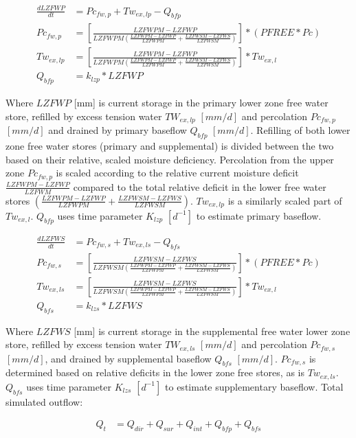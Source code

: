 \begin{align}
	\frac{dLZFWP}{dt} &= Pc_{fw,p} + Tw_{ex,lp} - Q_{bfp} \\
	Pc_{fw,p} &= \left[\frac{LZFWPM-LZFWP}{LZFWPM\left(\frac{LZFWPM-LZFWP}{LZFWPM}+\frac{LZFWSM-LZFWS}{LZFWSM}\right)}\right]*\left(PFREE*Pc\right)\\
	Tw_{ex,lp} &= \left[\frac{LZFWPM-LZFWP}{LZFWPM\left(\frac{LZFWPM-LZFWP}{LZFWPM}+\frac{LZFWSM-LZFWS}{LZFWSM}\right)}\right]*Tw_{ex,l}\\
	Q_{bfp} &= k_{lzp}*LZFWP
\end{align}

Where $LZFWP$ [mm] is current storage in the primary lower zone free water store, refilled by excess tension water $TW_{ex,lp}$ $[mm/d]$ and percolation $Pc_{fw,p}$ $[mm/d]$ and drained by primary baseflow $Q_{bfp}$ $[mm/d]$.
Refilling of both lower zone free water stores (primary and supplemental) is divided between the two based on their relative, scaled moisture deficiency.
Percolation from the upper zone $Pc_{fw,p}$ is scaled according to the relative current moisture deficit $\frac{LZFWPM-LZFWP}{LZFWM}$ compared to the total relative deficit in the lower free water stores $\left(\frac{LZFWPM-LZFWP}{LZFWPM}+\frac{LZFWSM-LZFWS}{LZFWSM}\right)$.
$Tw_{ex,lp}$ is a similarly scaled part of $Tw_{ex,l}$.
$Q_{bfp}$ uses time parameter $K_{lzp}$ $[d^{-1}]$ to estimate primary baseflow.

\begin{align}
	\frac{dLZFWS}{dt} &= Pc_{fw,s} + Tw_{ex,ls} - Q_{bfs} \\
	Pc_{fw,s} &= \left[\frac{LZFWSM-LZFWS}{LZFWSM\left(\frac{LZFWPM-LZFWP}{LZFWPM}+\frac{LZFWSM-LZFWS}{LZFWSM}\right)}\right]*\left(PFREE*Pc\right)\\
	Tw_{ex,ls} &= \left[\frac{LZFWSM-LZFWS}{LZFWSM\left(\frac{LZFWPM-LZFWP}{LZFWPM}+\frac{LZFWSM-LZFWS}{LZFWSM}\right)}\right]*Tw_{ex,l}\\
	Q_{bfs} &= k_{lzs}*LZFWS
\end{align}

Where $LZFWS$ [mm] is current storage in the supplemental free water lower zone store, refilled by excess tension water $TW_{ex,ls}$ $[mm/d]$ and percolation $Pc_{fw,s}$ $[mm/d]$, and drained by supplemental baseflow $Q_{bfs}$ $[mm/d]$. 
$Pc_{fw,s}$ is determined based on relative deficits in the lower zone free stores, as is $Tw_{ex,ls}$.
$Q_{bfs}$ uses time parameter $K_{lzs}$ $[d^{-1}]$ to estimate supplementary baseflow. Total simulated outflow:

\begin{align}
	Q_t &= Q_{dir} + Q_{sur} + Q_{int} + Q_{bfp} + Q_{bfs}
\end{align}

